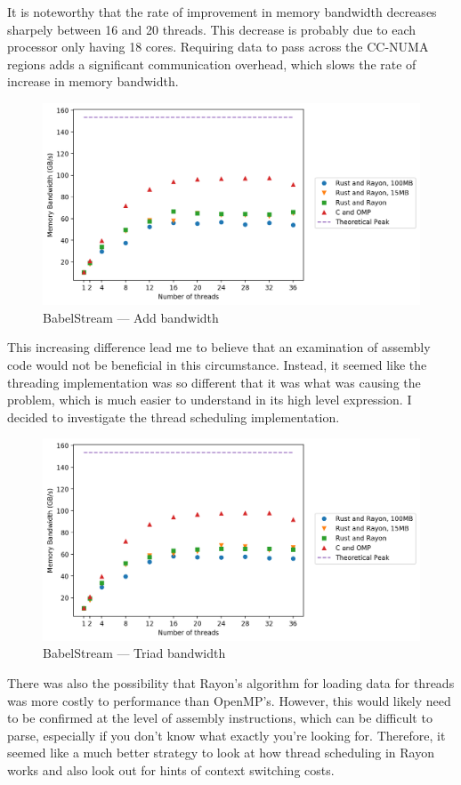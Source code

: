 It is noteworthy that the rate of improvement in memory bandwidth decreases sharpely between 16 and 20 threads. This decrease is probably due to each processor only having 18 cores. Requiring data to pass across the CC-NUMA regions adds a significant communication overhead, which slows the rate of increase in memory bandwidth.
\begin{figure}[h]
\centering
\includegraphics[width=.9\linewidth]{figs/babel/Add.png}
\caption{BabelStream --- Add bandwidth}\label{fig:babel-add}
\end{figure}

This increasing difference lead me to believe that an examination of assembly code would not be beneficial in this circumstance. Instead, it seemed like the threading implementation was so different that it was what was causing the problem, which is much easier to understand in its high level expression. I decided to investigate the thread scheduling implementation.

\begin{figure}[h]
\centering
\includegraphics[width=.9\linewidth]{figs/babel/Triad.png}
\caption{BabelStream --- Triad bandwidth}\label{fig:babel-triad}
\end{figure}

There was also the possibility that Rayon's algorithm for loading data for threads was more costly to performance than OpenMP's. However, this would likely need to be confirmed at the level of assembly instructions, which can be difficult to parse, especially if you don't know what exactly you're looking for. Therefore, it seemed like a much better strategy to look at how thread scheduling in Rayon works  and also look out for hints of context switching costs.

